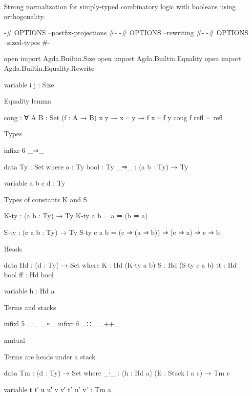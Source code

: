 
Strong normalization for simply-typed combinatory logic with booleans
using orthogonality.


\begin{code}
{-# OPTIONS --postfix-projections #-}
{-# OPTIONS --rewriting #-}
{-# OPTIONS --sized-types #-}

open import Agda.Builtin.Size
open import Agda.Builtin.Equality
open import Agda.Builtin.Equality.Rewrite

variable i j : Size
\end{code}

Equality lemma

\begin{code}
cong : ∀ {A B : Set} (f : A → B) {x y} → x ≡ y → f x ≡ f y
cong f refl = refl
\end{code}


Types

\begin{code}
infixr 6 _⇒_

data Ty : Set where
  o     : Ty
  bool  : Ty
  _⇒_   : (a b : Ty) → Ty

variable a b c d : Ty
\end{code}

Types of constants K and S

\begin{code}
K-ty : (a b : Ty) → Ty
K-ty a b = a ⇒ (b ⇒ a)

S-ty : (c a b : Ty) → Ty
S-ty c a b = (c ⇒ (a ⇒ b)) ⇒ (c ⇒ a) ⇒ c ⇒ b
\end{code}

Heads

\begin{code}
data Hd : (d : Ty) → Set where
  K   : Hd (K-ty a b)
  S   : Hd (S-ty c a b)
  tt  : Hd bool
  ff  : Hd bool

variable h : Hd a
\end{code}

Terms and stacks

\begin{code}
infixl 5 _∙_ _∘_
infixr 6 _∷_ _++_

mutual
\end{code}

  Terms are heads under a stack

\begin{code}
  data Tm : (d : Ty) → Set where
    _∙_ : (h : Hd a) (E : Stack i a c) → Tm c

  variable t t′ u u′ v v′ t' u' v' : Tm a
\end{code}

